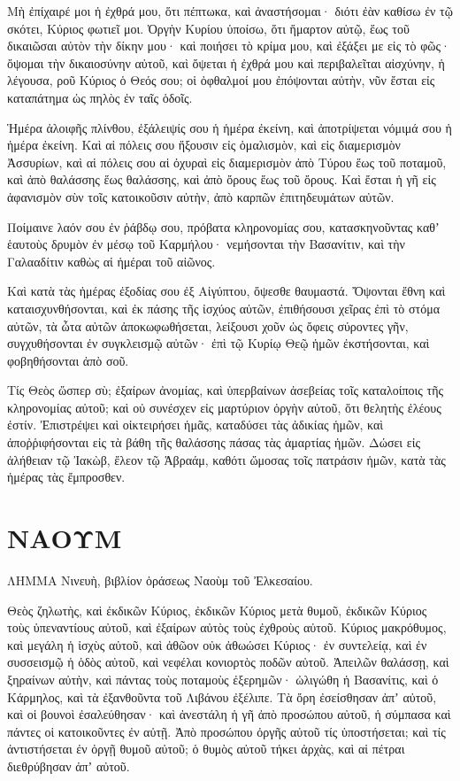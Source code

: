 \begin{spacing}{1.1}
\begin{multicols}{2}
Μὴ ἐπίχαιρέ μοι ἡ ἐχθρά μου, ὅτι πέπτωκα, καὶ ἀναστήσομαι· διότι ἐὰν καθίσω ἐν τῷ σκότει, Κύριος φωτιεῖ μοι.
Ὀργὴν Κυρίου ὑποίσω, ὅτι ἥμαρτον αὐτῷ, ἕως τοῦ δικαιῶσαι αὐτὸν τὴν δίκην μου· καὶ ποιήσει τὸ κρίμα μου, καὶ ἐξάξει με εἰς τὸ φῶς· ὄψομαι τὴν δικαιοσύνην αὐτοῦ,
καὶ ὄψεται ἡ ἐχθρά μου καὶ περιβαλεῖται αἰσχύνην, ἡ λέγουσα, ροῦ Κύριος ὁ Θεός σου; οἱ ὀφθαλμοί μου ἐπόψονται αὐτὴν, νῦν ἔσται εἰς καταπάτημα ὡς πηλὸς ἐν ταῖς ὁδοῖς.

Ἡμέρα ἀλοιφῆς πλίνθου, ἐξάλειψίς σου ἡ ἡμέρα ἐκείνη, καὶ ἀποτρίψεται νόμιμά σου ἡ ἡμέρα ἐκείνη.
Καὶ αἱ πόλεις σου ἥξουσιν εἰς ὁμαλισμὸν, καὶ εἰς διαμερισμὸν Ἀσσυρίων, καὶ αἱ πόλεις σου αἱ ὀχυραὶ εἰς διαμερισμὸν ἀπὸ Τύρου ἕως τοῦ ποταμοῦ, καὶ ἀπὸ θαλάσσης ἕως θαλάσσης, καὶ ἀπὸ ὄρους ἕως τοῦ ὄρους.
Καὶ ἔσται ἡ γῆ εἰς ἀφανισμὸν σὺν τοῖς κατοικοῦσιν αὐτὴν, ἀπὸ καρπῶν ἐπιτηδευμάτων αὐτῶν.

Ποίμαινε λαόν σου ἐν ῥάβδῳ σου, πρόβατα κληρονομίας σου, κατασκηνοῦντας καθʼ ἑαυτοὺς δρυμὸν ἐν μέσῳ τοῦ Καρμήλου· νεμήσονται τὴν Βασανίτιν, καὶ τὴν Γαλααδίτιν καθὼς αἱ ἡμέραι τοῦ αἰῶνος.

Καὶ κατὰ τὰς ἡμέρας ἐξοδίας σου ἐξ Αἰγύπτου, ὄψεσθε θαυμαστά.
Ὄψονται ἔθνη καὶ καταισχυνθήσονται, καὶ ἐκ πάσης τῆς ἰσχύος αὐτῶν, ἐπιθήσουσι χεῖρας ἐπὶ τὸ στόμα αὐτῶν, τὰ ὦτα αὐτῶν ἀποκωφωθήσεται,
λείξουσι χοῦν ὡς ὄφεις σύροντες γῆν, συγχυθήσονται ἐν συγκλεισμῷ αὐτῶν· ἐπὶ τῷ Κυρίῳ Θεῷ ἡμῶν ἐκστήσονται, καὶ φοβηθήσονται ἀπὸ σοῦ.

Τίς Θεὸς ὥσπερ σὺ; ἐξαίρων ἀνομίας, καὶ ὑπερβαίνων ἀσεβείας τοῖς καταλοίποις τῆς κληρονομίας αὐτοῦ; καὶ οὐ συνέσχεν εἰς μαρτύριον ὀργὴν αὐτοῦ, ὅτι θελητὴς ἐλέους ἐστίν.
Ἐπιστρέψει καὶ οἰκτειρήσει ἡμᾶς, καταδύσει τὰς ἀδικίας ἡμῶν, καὶ ἀποῤῥιφήσονται εἰς τὰ βάθη τῆς θαλάσσης πάσας τὰς ἁμαρτίας ἡμῶν.
Δώσει εἰς ἀλήθειαν τῷ Ἰακὼβ, ἔλεον τῷ Ἁβραάμ, καθότι ὤμοσας τοῖς πατράσιν ἡμῶν, κατὰ τὰς ἡμέρας τὰς ἔμπροσθεν.


\end{multicols}
\chapter{ΝΑΟΥΜ}
\begin{multicols}{2}

ΛΗΜΜΑ Νινευὴ, βιβλίον ὁράσεως Ναοὺμ τοῦ Ἐλκεσαίου.

Θεὸς ζηλωτὴς, καὶ ἐκδικῶν Κύριος, ἐκδικῶν Κύριος μετὰ θυμοῦ, ἐκδικῶν Κύριος τοὺς ὑπεναντίους αὐτοῦ, καὶ ἐξαίρων αὐτὸς τοὺς ἐχθροὺς αὐτοῦ.
Κύριος μακρόθυμος, καὶ μεγάλη ἡ ἰσχὺς αὐτοῦ, καὶ ἀθῶον οὐκ ἀθωώσει Κύριος· ἐν συντελείᾳ, καὶ ἐν συσσεισμῷ ἡ ὁδὸς αὐτοῦ, καὶ νεφέλαι κονιορτὸς ποδῶν αὐτοῦ.
Ἀπειλῶν θαλάσσῃ, καὶ ξηραίνων αὐτὴν, καὶ πάντας τοὺς ποταμοὺς ἐξερημῶν· ὠλιγώθη ἡ Βασανίτις, καὶ ὁ Κάρμηλος, καὶ τὰ ἐξανθοῦντα τοῦ Λιβάνου ἐξέλιπε.
Τὰ ὄρη ἐσείσθησαν ἀπʼ αὐτοῦ, καὶ οἱ βουνοὶ ἐσαλεύθησαν· καὶ ἀνεστάλη ἡ γῆ ἀπὸ προσώπου αὐτοῦ, ἡ σύμπασα καὶ πάντες οἱ κατοικοῦντες ἐν αὐτῇ.
Ἀπὸ προσώπου ὀργῆς αὐτοῦ τίς ὑποστήσεται; καὶ τίς ἀντιστήσεται ἐν ὀργῇ θυμοῦ αὐτοῦ; ὁ θυμὸς αὐτοῦ τήκει ἀρχὰς, καὶ αἱ πέτραι διεθρύβησαν ἀπʼ αὐτοῦ.


\end{multicols}
\end{spacing}
